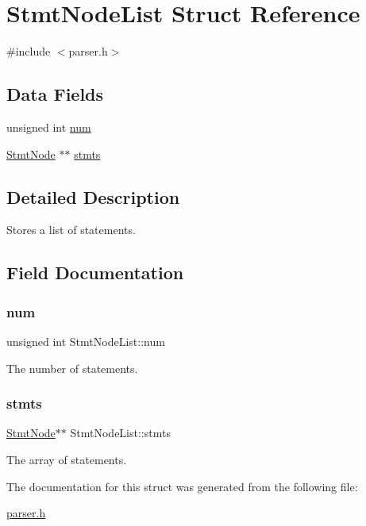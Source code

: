 \hypertarget{struct_stmt_node_list}{}\section{Stmt\+Node\+List Struct Reference}
\label{struct_stmt_node_list}


{\ttfamily \#include $<$parser.\+h$>$}

\subsection*{Data Fields}
\begin{DoxyCompactItemize}
\item 
unsigned int \hyperlink{struct_stmt_node_list_a9036accbc55ef84c8f35058c6536fcd9}{num}
\item 
\hyperlink{struct_stmt_node}{Stmt\+Node} $\ast$$\ast$ \hyperlink{struct_stmt_node_list_a2e9faa29350794b5434f3e2e59d048a7}{stmts}
\end{DoxyCompactItemize}


\subsection{Detailed Description}
Stores a list of statements. 

\subsection{Field Documentation}
\mbox{\label{struct_stmt_node_list_a9036accbc55ef84c8f35058c6536fcd9}} 
\subsubsection{\texorpdfstring{num}{num}}
{\footnotesize\ttfamily unsigned int Stmt\+Node\+List\+::num}

The number of statements. \mbox{\label{struct_stmt_node_list_a2e9faa29350794b5434f3e2e59d048a7}} 
\subsubsection{\texorpdfstring{stmts}{stmts}}
{\footnotesize\ttfamily \hyperlink{struct_stmt_node}{Stmt\+Node}$\ast$$\ast$ Stmt\+Node\+List\+::stmts}

The array of statements. 

The documentation for this struct was generated from the following file\+:\begin{DoxyCompactItemize}
\item 
\hyperlink{parser_8h}{parser.\+h}\end{DoxyCompactItemize}
